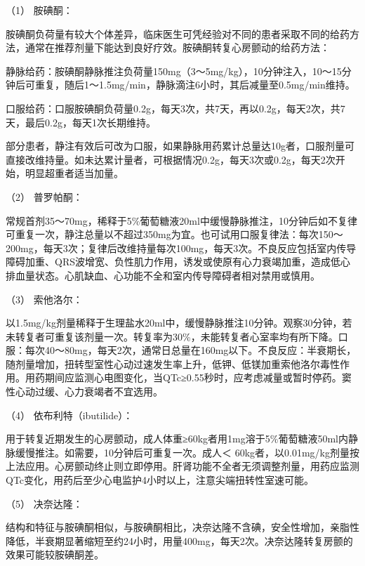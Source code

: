 \hypertarget{text00291.htmlux5cux23CHP10-2-4-3-3-3-1-1}{}
（1） 胺碘酮：

胺碘酮负荷量有较大个体差异，临床医生可凭经验对不同的患者采取不同的给药方法，通常在推荐剂量下能达到良好疗效。胺碘酮转复心房颤动的给药方法：

静脉给药：胺碘酮静脉推注负荷量150mg（3～5mg/kg），10分钟注入，10～15分钟后可重复，随后1～1.5mg/min，静脉滴注6小时，其后减量至0.5mg/min维持。

口服给药：口服胺碘酮负荷量0.2g，每天3次，共7天，再以0.2g，每天2次，共7天，最后0.2g，每天1次长期维持。

部分患者，静注有效后可改为口服，如果静脉用药累计总量达10g者，口服剂量可直接改维持量。如未达累计量者，可根据情况0.2g，每天3次或0.2g，每天2次开始，明显超重者适当加量。

\hypertarget{text00291.htmlux5cux23CHP10-2-4-3-3-3-1-2}{}
（2） 普罗帕酮：

常规首剂35～70mg，稀释于5\%葡萄糖液20ml中缓慢静脉推注，10分钟后如不复律可重复一次，静注总量以不超过350mg为宜。也可试用口服复律法：每次150～200mg，每天3次；复律后改维持量每次100mg，每天3次。不良反应包括室内传导障碍加重、QRS波增宽、负性肌力作用，诱发或使原有心力衰竭加重，造成低心排血量状态。心肌缺血、心功能不全和室内传导障碍者相对禁用或慎用。

\hypertarget{text00291.htmlux5cux23CHP10-2-4-3-3-3-1-3}{}
（3） 索他洛尔：

以1.5mg/kg剂量稀释于生理盐水20ml中，缓慢静脉推注10分钟。观察30分钟，若未转复者可重复该剂量一次。转复率为30\%，未能转复者心室率均有所下降。口服：每次40～80mg，每天2次，通常日总量在160mg以下。不良反应：半衰期长，随剂量增加，扭转型室性心动过速发生率上升，低钾、低镁加重索他洛尔毒性作用。用药期间应监测心电图变化，当QTc≥0.55秒时，应考虑减量或暂时停药。窦性心动过缓、心力衰竭者不宜选用。

\hypertarget{text00291.htmlux5cux23CHP10-2-4-3-3-3-1-4}{}
（4） 依布利特（ibutilide）：

用于转复近期发生的心房颤动，成人体重≥60kg者用1mg溶于5\%葡萄糖液50ml内静脉缓慢推注。如需要，10分钟后可重复一次。成人＜
60kg者，以0.01mg/kg剂量按上法应用。心房颤动终止则立即停用。肝肾功能不全者无须调整剂量，用药应监测QTc变化，用药后至少心电监护4小时以上，注意尖端扭转性室速可能。

\hypertarget{text00291.htmlux5cux23CHP10-2-4-3-3-3-1-5}{}
（5） 决奈达隆：

结构和特征与胺碘酮相似，与胺碘酮相比，决奈达隆不含碘，安全性增加，亲脂性降低，半衰期显著缩短至约24小时，用量400mg，每天2次。决奈达隆转复房颤的效果可能较胺碘酮差。

